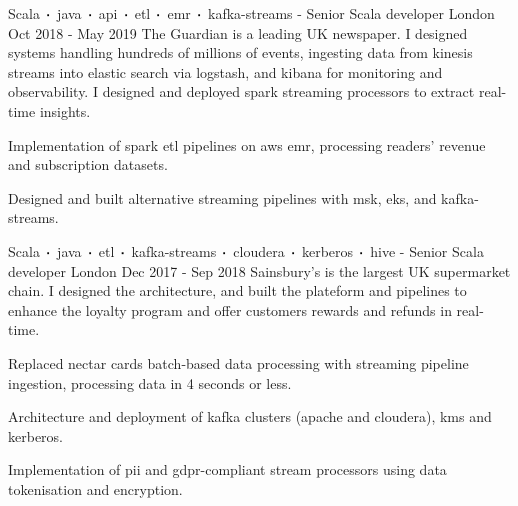 \begin{cventries}
    \cventry
    {Scala$\sqbig$java$\sqbig$api$\sqbig$etl$\sqbig$emr$\sqbig$kafka-streams}
    { - Senior Scala developer}
    {London}
    {Oct 2018 - May 2019}
    {The Guardian is a leading UK newspaper. I designed systems handling hundreds of millions of events, ingesting data from kinesis streams into elastic search via logstash, and kibana for monitoring and observability. I designed and deployed spark streaming processors to extract real-time insights.}
    {
        \begin{cvitems}
            \item{Implementation of spark etl pipelines on aws emr, processing readers' revenue and subscription datasets.}
            \item{Designed and built alternative streaming pipelines with msk, eks, and kafka-streams.}
        \end{cvitems}
    }

    \cventry
    {Scala$\sqbig$java$\sqbig$etl$\sqbig$kafka-streams$\sqbig$cloudera$\sqbig$kerberos$\sqbig$hive}
    { - Senior Scala developer}
    {London}
    {Dec 2017 - Sep 2018}
    {Sainsbury's is the largest UK supermarket chain. I designed the architecture, and built the plateform and pipelines to enhance the loyalty program and offer customers rewards and refunds in real-time.}
    {
        \begin{cvitems}
            \item{Replaced nectar cards batch-based data processing with streaming pipeline ingestion, processing data in 4 seconds or less.}
            \item{Architecture and deployment of kafka clusters (apache and cloudera), kms and kerberos.}
            \item{Implementation of pii and gdpr-compliant stream processors using data tokenisation and encryption.}
        \end{cvitems}
    }


\end{cventries}
